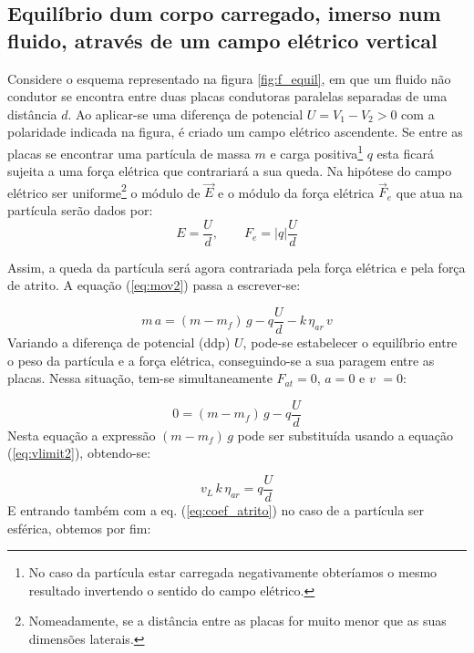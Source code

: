 \documentclass[12pt,a4paper,oneside]{paper}
\begin{document}

\subsection{\sf Equilíbrio dum corpo carregado, imerso num fluido, através de um campo elétrico vertical}

Considere o esquema representado na figura \ref{fig:f_equil}, em que um fluido não condutor se encontra entre duas placas
condutoras paralelas separadas de uma distância $d$. Ao aplicar-se uma diferença de potencial \mbox{$U = V_1 -V_2 > 0$} com a
polaridade indicada na figura, é criado um campo elétrico ascendente. Se entre as placas se encontrar uma partícula de massa $m$
e carga positiva\footnote{No caso da partícula estar carregada negativamente obteríamos o mesmo resultado invertendo o sentido do
campo elétrico.} $q$  esta ficará sujeita a uma força elétrica que contrariará a sua queda.
Na hipótese do campo elétrico ser uniforme\footnote{Nomeadamente, se a distância entre as placas for muito menor que as suas
dimensões laterais.} o módulo de $\vec{E}$ e o módulo da força elétrica $\vec{F}_e$ que atua na partícula serão dados por:
\begin{equation*}
	E = \frac{U}{d}, \qquad  F_e = |q| \frac{U}{d}
\end{equation*}

Assim, a queda da partícula será agora contrariada pela força elétrica e pela força de atrito.
A equação (\ref{eq:mov2}) passa a escrever-se:

\begin{equation}
	\label{eq:mov3}
	m\,a = (m - m_f)\,g  - q \frac{U}{d} - k  \, \eta_{ar} \, v
\end{equation}
Variando a diferença de potencial (ddp) $U$, pode-se estabelecer o equilíbrio entre o peso da partícula e a força elétrica,
conseguindo-se a sua paragem entre as placas. Nessa situação, tem-se simultaneamente $F_{at}=0$, $a=0$ e  $v$  $=0$:

\begin{equation}
	\label{eq:equil}
	0 = (m - m_f)\,g  - q \frac{U}{d} 
\end{equation}
Nesta equação a expressão $(m - m_f)\,g$ pode ser substituída usando a equação (\ref{eq:vlimit2}), obtendo-se:

\begin{equation*}
	v_L\, k\, \eta_{ar} = q \frac{U}{d}
\end{equation*}
E entrando também com a eq. (\ref{eq:coef_atrito}) no caso de a partícula ser esférica, obtemos por fim:
\end{document}
